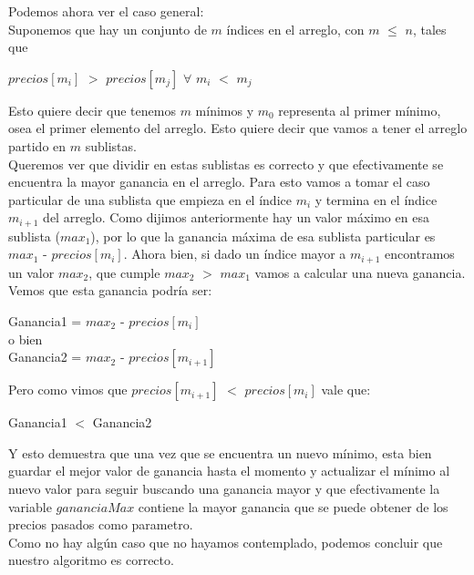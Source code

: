 \indent Podemos ahora ver el caso general:\\
\indent Suponemos que hay un conjunto de $m$ índices en el arreglo, con $m$
$\leq$ $n$, tales que 
\begin{center}
 $precios[m_i]$ $>$ $precios[m_j]$ $\forall$ $m_i$ $<$ $m_j$ 
\end{center}
Esto quiere decir que tenemos $m$ mínimos y $m_0$ representa al primer mínimo,
osea el primer elemento del arreglo. Esto quiere decir que vamos a tener el
arreglo partido en $m$ sublistas.\\
\indent Queremos ver que dividir en estas sublistas es correcto y que
efectivamente se encuentra la mayor ganancia en el arreglo. Para esto vamos a
tomar el caso particular de una sublista que empieza en el índice $m_i$ y
termina en el índice $m_{i+1}$ del arreglo. Como dijimos anteriormente hay un
valor máximo en esa sublista ($max_1$), por lo que la ganancia máxima de esa
sublista particular es $max_1$ -  $precios[m_i]$. Ahora bien, si dado un índice
mayor a $m_{i+1}$ encontramos un valor $max_2$, que cumple $max_2$ $>$ $max_1$
vamos a calcular una nueva ganancia. Vemos que esta ganancia podría ser:
\begin{center}
 Ganancia1 = $max_2$ -  $precios[m_i]$\\
 o bien\\
 Ganancia2 = $max_2$ -  $precios[m_{i+1}]$\\
\end{center}
\indent Pero como vimos que $precios[m_{i+1}]$ $<$ $precios[m_i]$ vale que:
\begin{center}
 Ganancia1 $<$ Ganancia2
\end{center}
\indent Y esto demuestra que una vez que se encuentra un nuevo mínimo, esta bien
guardar el mejor valor de ganancia hasta el momento y actualizar el mínimo al
nuevo valor para seguir buscando una ganancia mayor y que efectivamente la
variable $gananciaMax$ contiene la mayor ganancia que se puede obtener de los
precios pasados como parametro.\\
\indent Como no hay algún caso que no hayamos contemplado, podemos concluir que
nuestro algoritmo es correcto.




\clearpage

